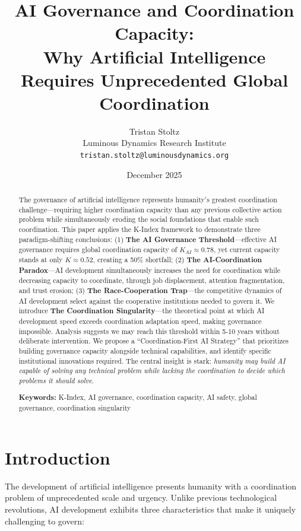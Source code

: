 \documentclass[11pt,letterpaper]{article}
\title{\textbf{AI Governance and Coordination Capacity: \\
Why Artificial Intelligence Requires Unprecedented Global Coordination}}
\author{Tristan Stoltz\\
\small Luminous Dynamics Research Institute\\
\small \texttt{tristan.stoltz@luminousdynamics.org}}
\date{December 2025}
\newcommand{\kindex}{K}
\newcommand{\Kai}{K_{AI}}
\begin{document}
\maketitle

\begin{abstract}
The governance of artificial intelligence represents humanity's greatest coordination challenge---requiring higher coordination capacity than any previous collective action problem while simultaneously eroding the social foundations that enable such coordination. This paper applies the K-Index framework to demonstrate three paradigm-shifting conclusions: (1) \textbf{The AI Governance Threshold}---effective AI governance requires global coordination capacity of $\Kai \approx 0.78$, yet current capacity stands at only $\kindex \approx 0.52$, creating a 50\% shortfall; (2) \textbf{The AI-Coordination Paradox}---AI development simultaneously increases the need for coordination while decreasing capacity to coordinate, through job displacement, attention fragmentation, and trust erosion; (3) \textbf{The Race-Cooperation Trap}---the competitive dynamics of AI development select against the cooperative institutions needed to govern it. We introduce \textbf{The Coordination Singularity}---the theoretical point at which AI development speed exceeds coordination adaptation speed, making governance impossible. Analysis suggests we may reach this threshold within 5-10 years without deliberate intervention. We propose a ``Coordination-First AI Strategy'' that prioritizes building governance capacity alongside technical capabilities, and identify specific institutional innovations required. The central insight is stark: \emph{humanity may build AI capable of solving any technical problem while lacking the coordination to decide which problems it should solve}.

\vspace{0.5em}
\noindent\textbf{Keywords:} K-Index, AI governance, coordination capacity, AI safety, global governance, coordination singularity
\end{abstract}

\section{Introduction}

The development of artificial intelligence presents humanity with a coordination problem of unprecedented scale and urgency. Unlike previous technological revolutions, AI development exhibits three characteristics that make it uniquely challenging to govern:
\end{document}
